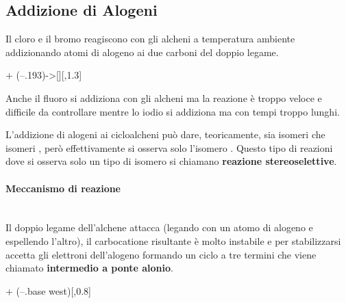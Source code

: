 \subsection{Addizione di Alogeni}
Il cloro e il bromo reagiscono con gli alcheni a temperatura ambiente addizionando atomi di alogeno ai due carboni del doppio legame.
\begin{reaction*}
	 +  \arrow(--.193){->[]}[,1.3] 
\end{reaction*}
Anche il fluoro si addiziona con gli alcheni ma la reazione è troppo veloce e difficile da controllare mentre lo iodio si addiziona ma con tempi troppo lunghi.

L'addizione di alogeni ai cicloalcheni può dare, teoricamente, sia isomeri \cis\;che isomeri \trans, però effettivamente si osserva solo l'isomero \trans. Questo tipo di reazioni dove si osserva solo un tipo di isomero si chiamano \textbf{reazione stereoselettive}.

\paragraph{Meccanismo di reazione}\mbox{}\\
Il doppio legame dell'alchene attacca  (legando con un atomo di alogeno e espellendo l'altro), il carbocatione risultante è molto instabile e per stabilizzarsi accetta gli elettroni dell'alogeno formando un ciclo a tre termini che viene chiamato \textbf{intermedio a ponte alonio}.

\begingroup
\chemnameinit{}
\begin{reaction}
	 + 
	\arrow[,0.8]
	\arrow(--.base west)[,0.8]
\end{reaction}
\endgroup

